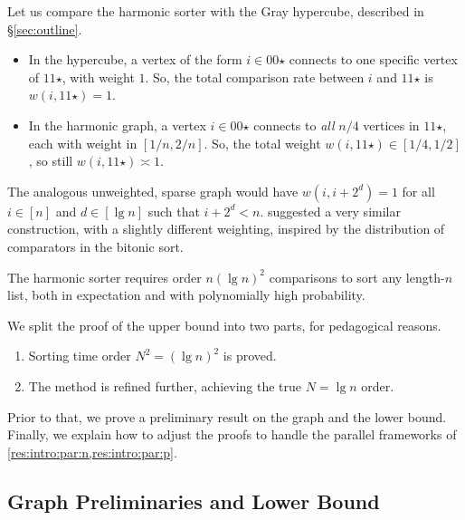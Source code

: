 \documentclass{article}
\newcommand{\mstar}{\mathord\star}
\begin{document}
Let us compare the harmonic sorter with the Gray hypercube, described in \S\ref{sec:outline}.

\begin{itemize}
	\item 
	In the hypercube, a vertex of the form $i \in 00\mstar$ connects to one specific vertex of $11\mstar$, with weight $1$. So, the total comparison rate between $i$ and $11\mstar$ is $w(i, 11\mstar) = 1$.
	
	\item 
	In the harmonic graph, a vertex $i \in 00\mstar$ connects to \emph{all} $n/4$ vertices in $11\mstar$, each with weight in $[1/n, 2/n]$. So, the total weight $w(i, 11\mstar) \in [1/4, 1/2]$, so still $w(i, 11\mstar) \asymp 1$.
\end{itemize}

The analogous unweighted, sparse graph would have $w(i, i + 2^d) = 1$ for all $i \in [n]$ and $d \in [\lg n]$ such that $i + 2^d < n$.
\textcite{I:random-sorting-network-se} suggested a very similar construction, with a slightly different weighting, inspired by the distribution of comparators in the bitonic sort.

\begin{thm}
\label{res:harm:sorting-time}
The harmonic sorter
requires order $n (\lg n)^2$ comparisons to sort any length-$n$ list,
both in expectation and with polynomially high probability.
\end{thm}

We split the proof of the upper bound into two parts, for pedagogical reasons.
\begin{enumerate}
	\item %
	Sorting time order $N^2 = (\lg n)^2$ is proved.
	
	\item %
	The method is refined further, achieving the true $N = \lg n$ order.
\end{enumerate}
Prior to that,
we prove a preliminary result on the graph and the lower bound.
Finally, we explain how to adjust the proofs to handle the parallel frameworks of \cref{res:intro:par:n,res:intro:par:p}.


\subsection{Graph Preliminaries and Lower Bound}
\label{sec:harm:prelim}
\end{document}
